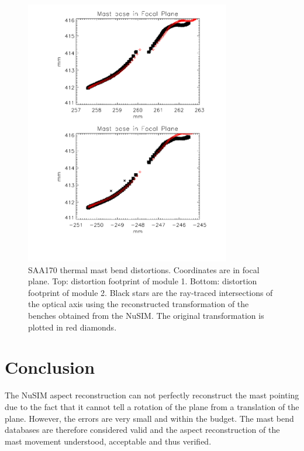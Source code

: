 \begin{figure}[tb]
\begin{center}
\includegraphics[width=0.8\textwidth]{images/saa170mastbend2.pdf}
\caption{SAA170 thermal mast bend distortions. Coordinates are in focal plane. Top: distortion footprint of module 1. Bottom: distortion footprint of module 2. Black stars are the ray-traced intersections of the optical axis using the reconstructed transformation of the benches obtained from the NuSIM. The original transformation is plotted in red diamonds.}
\label{saa170re}
\end{center}
\end{figure}

\section{Conclusion}
The NuSIM aspect reconstruction can not perfectly reconstruct the mast pointing due to the fact that it cannot tell a rotation of the plane from a translation of the plane. However, the errors are very small and within the budget. The mast bend databases are therefore considered valid and the aspect reconstruction of the mast movement understood, acceptable and thus verified.

%

